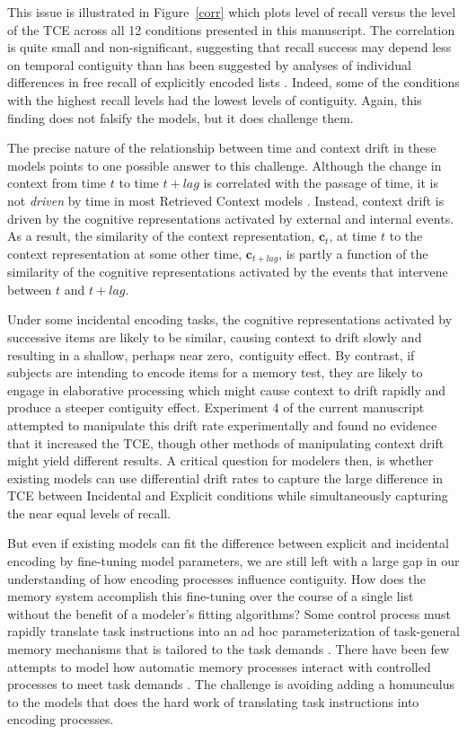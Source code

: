 \documentclass[man,natbib,floatsintext]{apa6} %
\begin{document}
This issue is illustrated in Figure~\ref{corr} which plots level of recall versus the level of the TCE across all 12 conditions presented in this manuscript. The correlation is quite small and non-significant, suggesting that recall success may depend less on temporal contiguity than has been suggested by analyses of individual differences in free recall of explicitly encoded lists \citep{SedeEtal10,HealEtal14}. Indeed, some of the conditions with the highest recall levels had the lowest levels of contiguity. Again, this finding does not falsify the models, but it does challenge them.

The precise nature of the relationship between time and context drift in these models points to one possible answer to this challenge. Although the change in context from time $t$ to time $t+lag$ is correlated with the passage of time, it is not \emph{driven} by time in most Retrieved Context models \citep[but see][for a model in which drift is driven by time]{HowaEtal14a}. Instead, context drift is driven by the cognitive representations activated by external and internal events. As a result, the similarity of the context representation, $\mathbf{c}_t$, at time $t$ to the context representation at some other time, $\mathbf{c}_{t+lag}$, is partly a function of the similarity of the cognitive representations activated by the events that intervene between $t$ and $t+lag$. 

Under some incidental encoding tasks, the cognitive representations activated by successive items are likely to be similar, causing context to drift slowly and resulting in a shallow, perhaps near zero,~contiguity effect. By contrast, if subjects are intending to encode items for a memory test, they are likely to engage in elaborative processing which might cause context to drift rapidly and produce a steeper contiguity effect. Experiment 4 of the current manuscript attempted to manipulate this drift rate experimentally and found no evidence that it increased the TCE, though other methods of manipulating context drift \citep[e.g.,][]{PolyEtal12} might yield different results. A critical question for modelers then, is whether existing models can use differential drift rates to capture the large difference in TCE between Incidental and Explicit conditions while simultaneously capturing the near equal levels of recall.

But even if existing models can fit the difference between explicit and incidental encoding by fine-tuning model parameters, we are still left with a large gap in our understanding of how encoding processes influence contiguity. How does the memory system accomplish this fine-tuning over the course of a single list without the benefit of a modeler's fitting algorithms? Some control process must rapidly translate task instructions into an ad hoc parameterization of task-general memory mechanisms that is tailored to the task demands \citep{HealEtal14,AtkiShif68}. There have been few attempts to model how automatic memory processes interact with controlled processes to meet task demands \citep{LehmMalm13,PolyEtal09}. The challenge is avoiding adding a homunculus to the models that does the hard work of translating task instructions into encoding processes.
\end{document}
